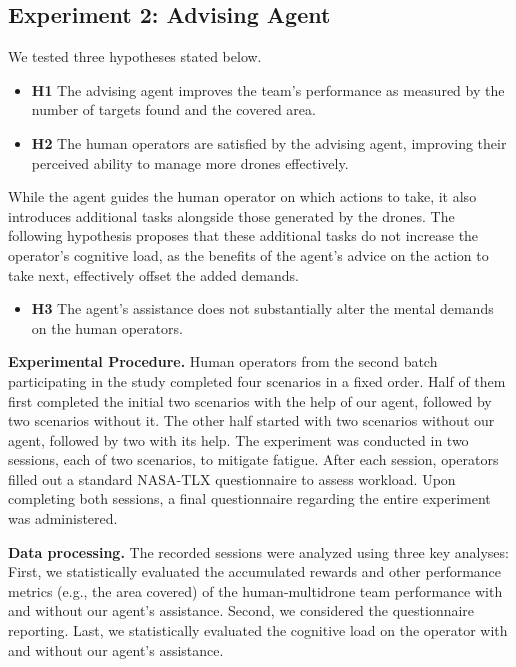 \subsection{Experiment 2: Advising Agent}
\label{EX2}
We tested three hypotheses stated below.
\begin{itemize}[leftmargin=10pt,topsep=0pt]
 \item {\bf H1} The advising agent improves the team's performance as measured by the number of targets found and the covered area.
\item {\bf H2} The human operators are satisfied by the advising agent, improving their perceived ability to manage more drones effectively. 
\end{itemize}
While the agent guides the human operator on which actions to take, it also introduces additional tasks alongside those generated by the drones. The following hypothesis proposes that these additional tasks do not increase the operator's cognitive load, as the benefits of the agent's advice on the action to take next, effectively offset the added demands.
\begin{itemize}[leftmargin=10pt,topsep=0pt]
\item {\bf H3} The agent's assistance does not substantially alter the mental demands on the human operators.
\end{itemize}

\noindent\textbf{Experimental Procedure.}
Human operators from the second batch participating in the study completed four scenarios in a fixed order. Half of them first completed the initial two scenarios with the help of our agent, followed by two scenarios without it. The other half started with two scenarios without our agent, followed by two with its help. 
The experiment was conducted in two sessions, each of two scenarios, to mitigate fatigue. After each session, operators filled out a standard NASA-TLX questionnaire \cite{Hart1988} to assess workload. Upon completing both sessions, a final questionnaire regarding the entire experiment was administered.

\noindent\textbf{Data processing.}
The recorded sessions were analyzed using three key analyses: First, we statistically evaluated the accumulated rewards and other performance metrics (e.g., the area covered) of the human-multidrone team performance with and without our agent's assistance. Second, we considered the questionnaire reporting.  
Last, we statistically evaluated the cognitive load on the operator with and without our agent's assistance.

